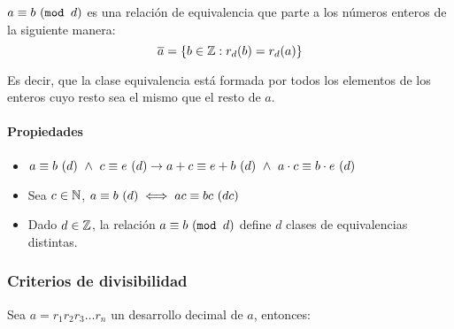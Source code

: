 $a \equiv b ~(\texttt{mod } d)$ es una relación de equivalencia que parte a los números enteros de la siguiente manera:
    $$\overline{a} = \{b\in\mathbb{Z} : r_d(b) = r_d(a)\}$$

Es decir, que la clase equivalencia está formada por todos los elementos de los enteros cuyo resto sea el mismo que el resto de $a$.

\paragraph{Propiedades}
\begin{itemize}
\item $a \equiv b ~(d) ~\land~ c \equiv e ~(d) \to a+c \equiv e+b ~(d) ~\land~ a\cdot c \equiv b\cdot e ~(d)$
\item Sea $c\in\mathbb{N}$, $a \equiv b ~(d)\iff a c \equiv b c ~(d c)$

\item Dado $d\in\mathbb{Z}$, la relación $a \equiv b ~(\texttt{mod } d)$ define $d$ clases de equivalencias distintas.
\end{itemize}
\subsubsection{Criterios de divisibilidad}
Sea $a = r_1r_2r_3\dots r_n$ un desarrollo decimal de $a$, entonces:

